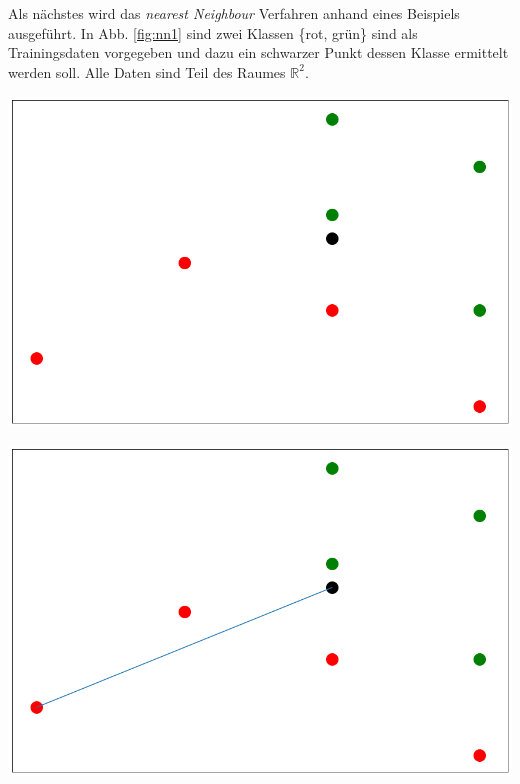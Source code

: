 \documentclass[fontsize=11pt]{scrartcl}
\newenvironment{Figure}
  {\par\medskip\noindent\minipage{\linewidth}}
  {\endminipage\par\medskip}
\begin{document}
				Als nächstes wird das \emph{nearest Neighbour} Verfahren anhand eines Beispiels ausgeführt.
				In Abb. \ref{fig:nn1} sind zwei Klassen \{rot, grün\} sind als Trainingsdaten vorgegeben und dazu ein schwarzer Punkt dessen Klasse ermittelt werden soll. Alle Daten sind Teil des Raumes $\mathbb{R}^2$.\par
                \begin{Figure}
                    \begin{minipage}[b]{.4\linewidth}
                        \includegraphics[width=\linewidth]{nn1.png}
                        \label{fig:nn1}       
                    \end{minipage}
                    \hspace*{.1\linewidth}
                    \begin{minipage}[b]{.4\linewidth}
                        \includegraphics[width=\linewidth]{nn2.png}
                           \label{fig:nn2} 
                    \end{minipage}
                \end{Figure}
\end{document}
